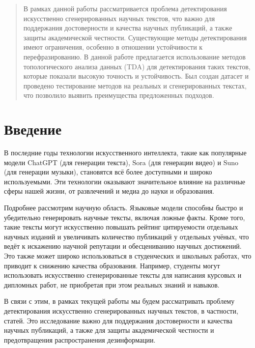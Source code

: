 \documentclass{math-mech-sci}
\begin{document}
\maketitle

\begin{abstract}
В рамках данной работы рассматривается проблема детектирования искусственно сгенерированных научных текстов, что важно для поддержания достоверности и качества научных публикаций, а также защиты академической честности. Существующие методы детектирования имеют ограничения, особенно в отношении устойчивости к перефразированию. В данной работе предлагается использование методов топологического анализа данных (TDA) для детектирования таких текстов, которые показали высокую точность и устойчивость. Был создан датасет и проведено тестирование методов на реальных и сгенерированных текстах, что позволило выявить преимущества предложенных подходов.

\end{abstract}

\section{Введение}
В последние годы технологии искусственного интеллекта, такие как популярные модели ChatGPT (для генерации текста), Sora (для генерации видео) и Suno (для генерации музыки), становятся всё более доступными и широко используемыми. Эти технологии оказывают значительное влияние на различные сферы нашей жизни, от развлечений и медиа до науки и образования.

Подробнее рассмотрим научную область. Языковые модели способны быстро и убедительно генерировать научные тексты, включая ложные факты. Кроме того, такие тексты могут искусственно повышать рейтинг цитируемости отдельных научных изданий и увеличивать количество публикаций у отдельных учёных, что ведёт к искажению научной репутации и обесцениванию научных достижений. Это также может широко использоваться в студенческих и школьных работах, что приводит к снижению качества образования. Например, студенты могут использовать искусственно сгенерированные тексты для написания курсовых и дипломных работ, не приобретая при этом реальных знаний и навыков.

В связи с этим, в рамках текущей работы мы будем рассматривать проблему детектирования искусственно сгенерированных научных текстов, в частности, статей. Это исследование важно для поддержания достоверности и качества научных публикаций, а также для защиты академической честности и предотвращения распространения дезинформации.
\end{document}
